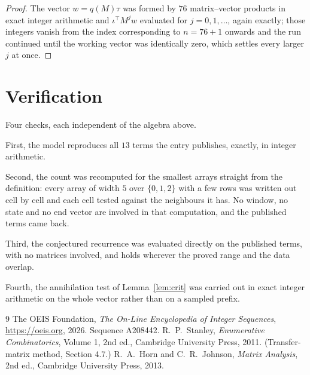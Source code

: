 \documentclass[11pt,a4paper]{article}
\theoremstyle{plain}
\theoremstyle{definition}
\begin{document}
\begin{proof}
The vector $w=q(M)\tau$ was formed by $76$ matrix--vector products in exact integer
arithmetic and $\iota^{\!\top}M^{j}w$ evaluated for $j=0,1,\dots$, again exactly; those
integers vanish from the index corresponding to $n=76+1$ onwards and the run continued
until the working vector was identically zero, which settles every larger $j$ at once.
\end{proof}

\section{Verification}

Four checks, each independent of the algebra above.

First, the model reproduces all $13$ terms the entry publishes, exactly, in integer
arithmetic.

Second, the count was recomputed for the smallest arrays straight from the definition: every
array of width $5$ over $\{0,1,2\}$ with a few rows was written out cell by cell and each cell
tested against the neighbours it has. No window, no state and no end vector are involved in that
computation, and the published terms came back.

Third, the conjectured recurrence was evaluated directly on the published terms, with no
matrices involved, and holds wherever the proved range and the data overlap.

Fourth, the annihilation test of Lemma~\ref{lem:crit} was carried out in exact integer
arithmetic on the whole vector rather than on a sampled prefix.

\begin{thebibliography}{9}
 The OEIS Foundation, \emph{The On-Line Encyclopedia of Integer
Sequences}, \url{https://oeis.org}, 2026. Sequence A208442.
 R.~P.~Stanley, \emph{Enumerative Combinatorics}, Volume 1, 2nd ed.,
Cambridge University Press, 2011. (Transfer-matrix method, Section 4.7.)
 R.~A.~Horn and C.~R.~Johnson, \emph{Matrix Analysis}, 2nd ed., Cambridge
University Press, 2013.
\end{thebibliography}
\end{document}
